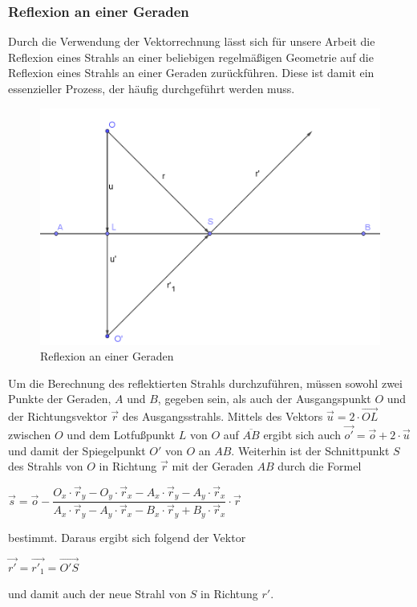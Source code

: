 \documentclass[reducespace,stylepage,semiarbeit]{spezidoc}
\begin{document}
\subsubsection{Reflexion an einer Geraden}
Durch die Verwendung der Vektorrechnung lässt sich für unsere Arbeit die Reflexion eines Strahls an einer beliebigen regelmäßigen Geometrie auf die Reflexion eines Strahls an einer Geraden zurückführen. 
Diese ist damit ein essenzieller Prozess, der häufig durchgeführt werden muss.\\
\begin{figure}
\includegraphics[scale=0.4]{pictures/LineRef.png}
\caption{Reflexion an einer Geraden}
\end{figure}
Um die Berechnung des reflektierten Strahls durchzuführen, müssen sowohl zwei Punkte der Geraden, $A$ und $B$, gegeben sein, als auch der Ausgangspunkt $O$ und der Richtungsvektor $\vec{r}$ des Ausgangsstrahls. 
Mittels des Vektors $\vec{u} = 2\cdot\overrightarrow{OL}$ zwischen $O$ und dem Lotfußpunkt $L$ von $O$ auf $\overline{AB}$ ergibt sich auch $\vec{o'} = \vec{o} + 2\cdot\vec{u}$ und damit der Spiegelpunkt $O'$ von $O$ an $AB$.
Weiterhin ist der Schnittpunkt $S$ des Strahls von $O$ in Richtung $\vec{r}$ mit der Geraden $AB$ durch die Formel
\begin{center}
$\vec{s} = \vec{o} - \dfrac{O_x \cdot \vec{r}_y - O_y \cdot \vec{r}_x - A_x \cdot \vec{r}_y - A_y \cdot \vec{r}_x}{A_x \cdot \vec{r}_y - A_y \cdot \vec{r}_x - B_x \cdot \vec{r}_y + B_y \cdot \vec{r}_x} \cdot \vec{r}$
\end{center}
bestimmt. 
Daraus ergibt sich folgend der Vektor
\begin{center}
$\vec{r'} = \vec{r'_1} = \overrightarrow{O'S}$
\end{center}
und damit auch der neue Strahl von $S$ in Richtung $r'$.
\end{document}
